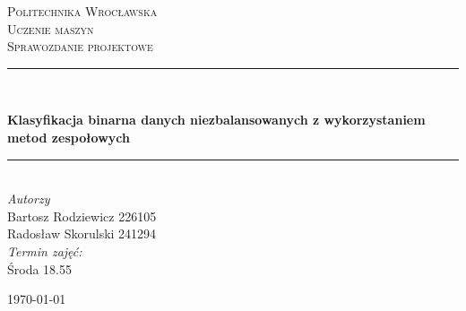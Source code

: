 
\begin{titlepage}
	\newcommand{\HRule}{\rule{\linewidth}{0.5mm}}
	
	\center

	\textsc{\LARGE Politechnika Wrocławska}\\[1.5cm] %
	
	\textsc{\Large Uczenie maszyn}\\[0.5cm] %
	
	\textsc{\large Sprawozdanie projektowe}\\[0.5cm] %

	\HRule\\[0.4cm]
	
	{\huge\bfseries Klasyfikacja binarna danych niezbalansowanych z wykorzystaniem metod
zespołowych\par}
	\vspace{0.4cm}
	\HRule\\[1.5cm]

	{\large\textit{Autorzy}}\\
	Bartosz Rodziewicz \textsc{226105}\\
	Radosław Skorulski \textsc{241294}\\
	\vfill
	\textit{Termin zajęć:}\\
	Środa 18.55
	
	\vfill\vfill\vfill\vfill\vfill\vfill\vfill\vfill
	
	{\large \today}

	
	\vfill
	
\end{titlepage}
